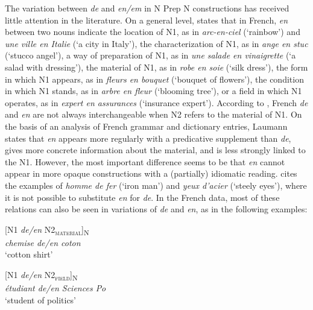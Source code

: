 \documentclass[output=paper]{langsci/langscibook}
\begin{document}
The variation between \textit{de} and \textit{en/em} in N Prep N constructions has received little attention in the literature. On a general level, \citet[411]{Lang:1991} states that in French, \textit{en} between two nouns indicate the location of N1, as in \textit{arc-en-ciel} (`rainbow') and \textit{une ville en Italie} (`a city in Italy'), the characterization of N1, as in \textit{ange en stuc} (`stucco angel'), a way of preparation of N1, as in \textit{une salade en vinaigrette} (`a salad with dressing'), the material of N1, as in \textit{robe en soie} (`silk dress'), the form in which N1 appears, as in \textit{fleurs en bouquet} (`bouquet of flowers'), the condition in which N1 stands, as in \textit{arbre en fleur} (`blooming tree'), or a field in which N1 operates, as in \textit{expert en assurances} (`insurance expert'). According to \citet[55]{Laumann:1998}, French \textit{de} and \textit{en} are not always interchangeable when N2 refers to the material of N1. On the basis of an analysis of French grammar and dictionary entries, Laumann states that \textit{en} appears more regularly with a predicative supplement than \textit{de}, gives more concrete information about the material, and is less strongly linked to the N1. However, the most important difference seems to be that \textit{en} cannot appear in more opaque constructions with a (partially) idiomatic reading. \citet[55]{Laumann:1998} cites the examples of \textit{homme de fer} (`iron man') and \textit{yeux d’acier} (`steely eyes'), where it is not possible to substitute \textit{en} for \textit{de}. In the French data, most of these relations can also be seen in variations of \textit{de} and \textit{en}, as in the following examples:

\begin{exe}\ex\begin{minipage}[t]{0.4\textwidth}    %
[N1 \textit{de/en} N2\textsubscript{\scshape material}]\textsubscript{N}\\
\textit{chemise de/en coton}\\
`cotton shirt'
\end{minipage}\hfill            %
\begin{minipage}[t]{0.45\textwidth}
[N1 \textit{de/en} N2\textsubscript{\scshape field}]\textsubscript{N}\\
\textit{étudiant de/en Sciences Po}\\
`student of politics'
\end{minipage}
\end{exe}
\end{document}
